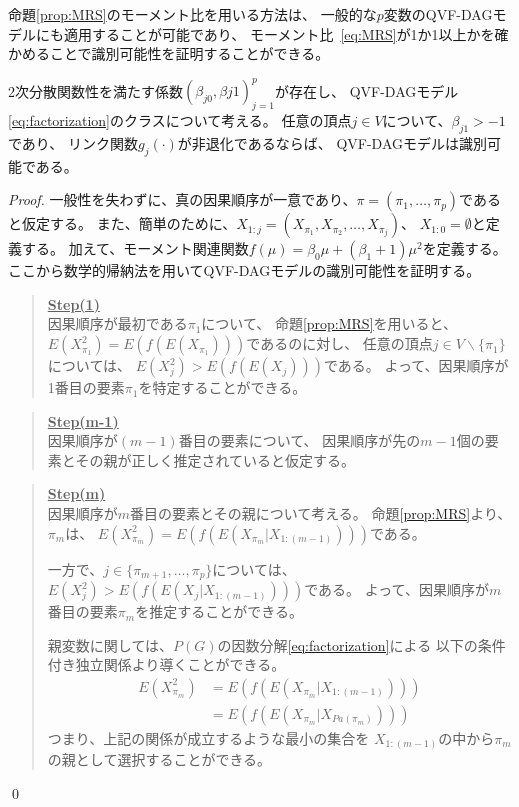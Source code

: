 命題\ref{prop:MRS}のモーメント比を用いる方法は、
一般的な$p$変数のQVF-DAGモデルにも適用することが可能であり、
モーメント比~\eqref{eq:MRS}が1か1以上かを確かめることで識別可能性を証明することができる。

\begin{theo}
  2次分散関数性を満たす係数$(\beta_{j0}, \beta{j1})_{j=1}^p$が存在し、
  QVF-DAGモデル\eqref{eq:factorization}のクラスについて考える。
  任意の頂点$j \in V$について、$\beta_{j1} > -1$であり、
  リンク関数$g_j(\cdot)$が非退化であるならば、
  QVF-DAGモデルは識別可能である。
\end{theo}

\begin{proof}
  一般性を失わずに、真の因果順序が一意であり、$\pi = (\pi_1, \dots, \pi_p)$であると仮定する。
  また、簡単のために、$X_{1:j} = (X_{\pi_1}, X_{\pi_2}, \dots, X_{\pi_j})$、
  $X_{1:0} = \emptyset$と定義する。
  加えて、モーメント関連関数$f(\mu) = \beta_0 \mu + (\beta_1 + 1)\mu^2$を定義する。
  ここから数学的帰納法を用いてQVF-DAGモデルの識別可能性を証明する。

  \begin{quote}
    \underline{\textbf{Step(1)}} \\
    因果順序が最初である$\pi_1$について、
    命題\ref{prop:MRS}を用いると、
    $E(X_{\pi_1}^2) = E(f(E(X_{\pi_1})))$であるのに対し、
    任意の頂点$j \in V \backslash \{ \pi_1 \}$については、
    $E(X_j ^2) > E(f(E(X_j)))$である。
    よって、因果順序が1番目の要素$\pi_1$を特定することができる。
  \end{quote}

  \begin{quote}
    \underline{\textbf{Step(m-1)}} \\
    因果順序が$(m-1)$番目の要素について、
    因果順序が先の$m-1$個の要素とその親が正しく推定されていると仮定する。
  \end{quote}

  \begin{quote}
    \underline{\textbf{Step(m)}} \\
    因果順序が$m$番目の要素とその親について考える。
    命題\ref{prop:MRS}より、$\pi_m$は、
    $E(X_{\pi_m}^2) = E(f(E(X_{\pi_m} | X_{1:(m-1)})))$である。

    一方で、$j \in \{ \pi_{m+1}, \dots, \pi_p \}$については、
    $E(X_j^2) > E(f(E(X_j | X_{1:(m-1)})))$である。
    よって、因果順序が$m$番目の要素$\pi_m$を推定することができる。

    親変数に関しては、$P(G)$の因数分解\eqref{eq:factorization}による
    以下の条件付き独立関係より導くことができる。
    \begin{align*}
      E(X_{\pi_m}^2) &= E(f(E(X_{\pi_m} | X_{1:(m-1)}))) \\
                     &= E(f(E(X_{\pi_m} | X_{Pa(\pi_m)})))
    \end{align*}
    つまり、上記の関係が成立するような最小の集合を
    $X_{1:(m-1)}$の中から$\pi_m$の親として選択することができる。
  \end{quote}
\qed
\end{proof}


